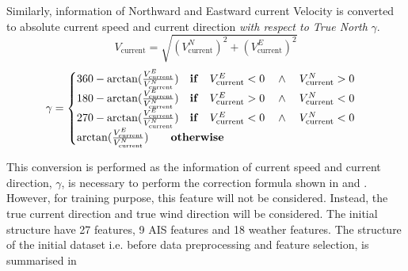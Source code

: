 Similarly, information of Northward and Eastward current Velocity is converted to absolute current speed and current direction \emph{with respect to True North} $\gamma$.\\ 

\begin{equation}\label{eqn:vcurrabs}
    V_{\text{current}} = \sqrt{(V_{\text{current}}^N)^2 + (V_{\text{current}}^E)^2} 
\end{equation}
\begin{equation}\label{eqn:currdir}
    \gamma = 
    \begin{cases}
        360 - \arctan(\frac{V_{\text{current}}^E}{V_{\text{current}}^N}) \quad \text{\textbf{if}} \quad V_{\text{current}}^E < 0 \quad \wedge \quad V_{\text{current}}^N > 0 \\ 
        180 - \arctan(\frac{V_{\text{current}}^E}{V_{\text{current}}^N}) \quad \text{\textbf{if}} \quad V_{\text{current}}^E > 0 \quad \wedge \quad V_{\text{current}}^N < 0 \\ 
        270 - \arctan(\frac{V_{\text{current}}^E}{V_{\text{current}}^N}) \quad \text{\textbf{if}} \quad V_{\text{current}}^E < 0 \quad \wedge \quad V_{\text{current}}^N < 0 \\
        \arctan(\frac{V_{\text{current}}^E}{V_{\text{current}}^N}) \qquad \text{\textbf{otherwise}} 
    \end{cases}   
\end{equation}

This conversion is performed as the information of current speed and current direction, $\gamma$, is necessary to perform the correction formula shown in  and . However, for training purpose, this feature will not be considered. Instead, the true current direction and true wind direction will be considered. The initial structure have 27 features, 9 AIS features and 18 weather features. The structure of the initial dataset i.e. before data preprocessing and feature selection, is summarised in  \\

